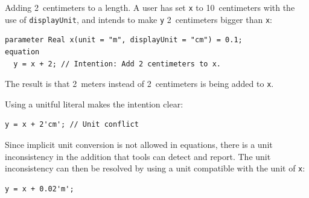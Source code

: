 \begin{example}
Adding 2~centimeters to a length.
A user has set \lstinline!x! to 10~centimeters with the use of \lstinline!displayUnit!, and intends to make \lstinline!y! 2~centimeters bigger than \lstinline!x!:
\begin{lstlisting}[language=modelica]
  parameter Real x(unit = "m", displayUnit = "cm") = 0.1;
equation
  y = x + 2; // Intention: Add 2 centimeters to x.
\end{lstlisting}
The result is that 2~meters instead of 2~centimeters is being added to \lstinline!x!.

Using a unitful literal makes the intention clear:
\begin{lstlisting}[language=modelica]
  y = x + 2'cm'; // Unit conflict
\end{lstlisting}
Since implicit unit conversion is not allowed in equations, there is a unit inconsistency in the addition that tools can detect and report.
The unit inconsistency can then be resolved by using a unit compatible with the unit of \lstinline!x!:
\begin{lstlisting}[language=modelica]
  y = x + 0.02'm';
\end{lstlisting}
\end{example}
